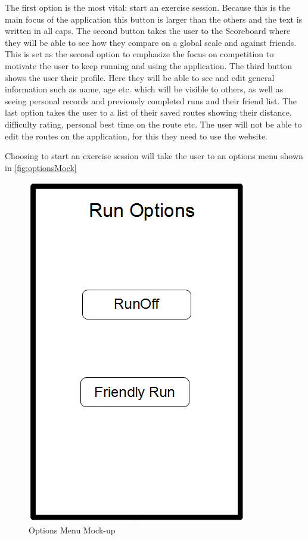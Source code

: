 The first option is the most vital: start an exercise session. Because this is the main focus of the application this button is larger than the others and the text is written in all caps. The second button takes the user to the Scoreboard where they will be able to see how they compare on a global scale and against friends. This is set as the second option to emphasize the focus on competition to motivate the user to keep running and using the application. The third button shows the user their profile. Here they will be able to see and edit general information such as name, age etc. which will be visible to others, as well as seeing personal records and previously completed runs and their friend list. The last option takes the user to a list of their saved routes showing their distance, difficulty rating, personal best time on the route etc. The user will not be able to edit the routes on the application, for this they need to use the website.
\vspace{10pt}

Choosing to start an exercise session will take the user to an options menu shown in \autoref{fig:optionsMock}

\begin{figure}[ht]
\begin{center}
 \caption{Options Menu Mock-up}
 \label{fig:optionsMock}
 \includegraphics[scale=0.4]{img/optionsMock.png}
\end{center}
\end{figure}

